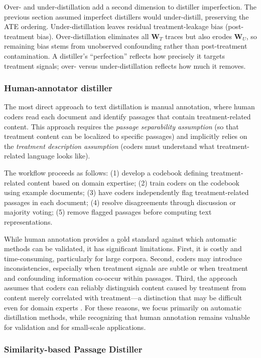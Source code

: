 \documentclass[11pt]{article}
\newcommand{\bW}{\bm{W}}  %
\begin{document}
Over- and under-distillation add a second dimension to distiller imperfection. The previous section assumed imperfect distillers would under-distill, preserving the ATE ordering. Under-distillation leaves residual treatment-leakage bias (post-treatment bias). Over-distillation eliminates all $\bW_T$ traces but also erodes $\bW_U$, so remaining bias stems from unobserved confounding rather than post-treatment contamination. A distiller's ``perfection'' reflects how precisely it targets treatment signals; over- versus under-distillation reflects how much it removes.

\subsubsection{Human-annotator distiller}

The most direct approach to text distillation is manual annotation, where human coders read each document and identify passages that contain treatment-related content. This approach requires the \emph{passage separability assumption} (so that treatment content can be localized to specific passages) and implicitly relies on the \emph{treatment description assumption} (coders must understand what treatment-related language looks like).

The workflow proceeds as follows: (1) develop a codebook defining treatment-related content based on domain expertise; (2) train coders on the codebook using example documents; (3) have coders independently flag treatment-related passages in each document; (4) resolve disagreements through discussion or majority voting; (5) remove flagged passages before computing text representations.

While human annotation provides a gold standard against which automatic methods can be validated, it has significant limitations. First, it is costly and time-consuming, particularly for large corpora. Second, coders may introduce inconsistencies, especially when treatment signals are subtle or when treatment and confounding information co-occur within passages. Third, the approach assumes that coders can reliably distinguish content caused by treatment from content merely correlated with treatment---a distinction that may be difficult even for domain experts \citep{audinet2024llms}. For these reasons, we focus primarily on automatic distillation methods, while recognizing that human annotation remains valuable for validation and for small-scale applications.

\subsubsection{Similarity-based Passage Distiller}
\end{document}
